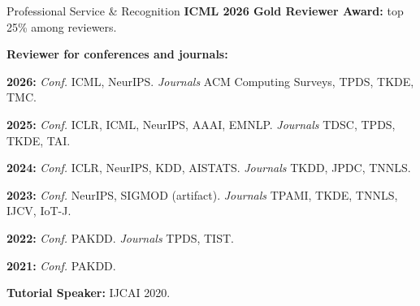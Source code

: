 \begin{rSection}{Professional Service \& Recognition}
\noindent\textbf{ICML 2026 Gold Reviewer Award:} top 25\% among reviewers.\par\vspace{0.4em}
\noindent\textbf{Reviewer for conferences and journals:}\par\vspace{0.15em}
\noindent\textbf{2026:} \textit{Conf.} ICML, NeurIPS. \textit{Journals} ACM Computing Surveys, TPDS, TKDE, TMC.\par\vspace{-0.35em}
\noindent\textbf{2025:} \textit{Conf.} ICLR, ICML, NeurIPS, AAAI, EMNLP. \textit{Journals} TDSC, TPDS, TKDE, TAI.\par\vspace{-0.35em}
\noindent\textbf{2024:} \textit{Conf.} ICLR, NeurIPS, KDD, AISTATS. \textit{Journals} TKDD, JPDC, TNNLS.\par\vspace{-0.35em}
\noindent\textbf{2023:} \textit{Conf.} NeurIPS, SIGMOD (artifact). \textit{Journals} TPAMI, TKDE, TNNLS, IJCV, IoT-J.\par\vspace{-0.35em}
\noindent\textbf{2022:} \textit{Conf.} PAKDD. \textit{Journals} TPDS, TIST.\par\vspace{-0.35em}
\noindent\textbf{2021:} \textit{Conf.} PAKDD.\par\vspace{0.15em}
\noindent\textbf{Tutorial Speaker:} IJCAI 2020.\par
\end{rSection}
